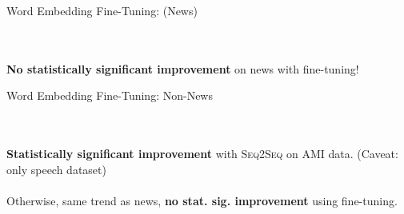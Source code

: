 \begin{frame}{Word Embedding Fine-Tuning: (News)}
  \begin{center}
    
 \end{center}

 ~\\
 
 
  ~\\



  \textbf{No statistically significant improvement} on news with fine-tuning!

\end{frame}

\begin{frame}{Word Embedding Fine-Tuning: Non-News}
 \begin{center}
  
 \end{center}

 ~\\
 
 
 ~\\


 \textbf{Statistically significant improvement} with \textsc{Seq2Seq} on AMI
 data. (Caveat: only speech dataset)\\

~\\
Otherwise, same trend as news, \textbf{no stat. sig. improvement} using fine-tuning.

\end{frame}

